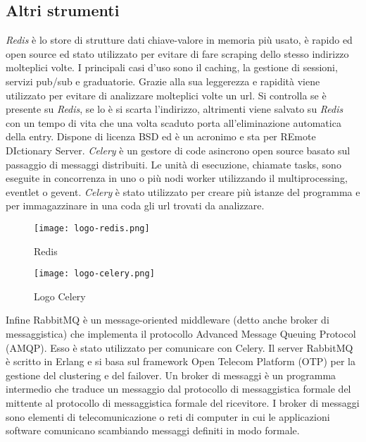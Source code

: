 \subsection{Altri strumenti}

\textit{Redis} è lo store di strutture dati chiave-valore in memoria più usato, è rapido ed open source ed stato utilizzato per evitare di fare scraping dello stesso indirizzo molteplici volte. I principali casi d'uso sono il caching, la gestione di sessioni, servizi pub/sub e graduatorie. Grazie alla sua leggerezza e rapidità viene utilizzato per evitare di analizzare molteplici volte un url. Si controlla se è presente su \textit{Redis}, se lo è si scarta l'indirizzo, altrimenti viene salvato su \textit{Redis} con un tempo di vita che una volta scaduto porta all'eliminazione automatica della entry. Dispone di licenza BSD ed è un acronimo e sta per REmote DIctionary Server.
\textit{Celery} è un gestore di code asincrono open source basato sul passaggio di messaggi distribuiti. Le unità di esecuzione, chiamate tasks, sono eseguite in concorrenza in uno o più nodi worker utilizzando il multiprocessing, eventlet o gevent. \textit{Celery} è stato utilizzato per creare più istanze del programma e per immagazzinare in una coda gli url trovati da analizzare.
\begin{figure}[!h]
    \begin{minipage}{.5\textwidth} 
        \centering 
        \texttt{[image: logo-redis.png]} 
        \caption{Redis} 
        \label{fig:redis} 
    \end{minipage}%
    \begin{minipage}{.5\textwidth} 
        \centering 
        \texttt{[image: logo-celery.png]} 
        \caption{Logo Celery} 
        \label{fig:celery} 
    \end{minipage}%
\end{figure}
Infine RabbitMQ è un message-oriented middleware (detto anche broker di messaggistica) che implementa il protocollo Advanced Message Queuing Protocol (AMQP). Esso è stato utilizzato per comunicare con Celery. Il server RabbitMQ è scritto in Erlang e si basa sul framework Open Telecom Platform (OTP) per la gestione del clustering e del failover. Un broker di messaggi è un programma intermedio che traduce un messaggio dal protocollo di messaggistica formale del mittente al protocollo di messaggistica formale del ricevitore. I broker di messaggi sono elementi di telecomunicazione o reti di computer in cui le applicazioni software comunicano scambiando messaggi definiti in modo formale. 

